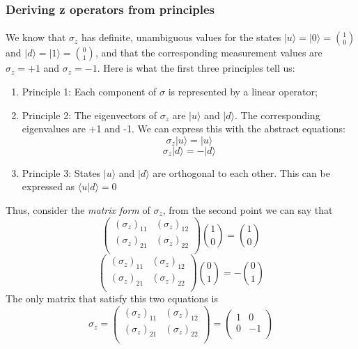 \documentclass[a4paper,10pt]{article}
\begin{document}
\subsubsection{Deriving z operators from principles}

\paragraph{} We know that $\sigma_z$ has definite, unambiguous values for the states $|u\rangle = |0\rangle = \binom{1}{0}$ and $|d\rangle = |1\rangle = \binom{0}{1}$, and that the corresponding measurement values are $\sigma_z = +1$ and $\sigma_z = -1$. Here is what the first three principles tell us:
\begin{enumerate}
    \item Principle 1: Each component of $\sigma$ is represented by a linear operator;
    \item Principle 2: The eigenvectors of $\sigma_z$ are $|u\rangle$ and $|d\rangle$. The corresponding eigenvalues are +1 and -1. We can express this with the abstract equations:
    $$\sigma_z|u\rangle = |u\rangle$$
    $$\sigma_z|d\rangle = -|d\rangle$$
    \item Principle 3: States $|u\rangle$ and $|d\rangle$ are orthogonal to each other. This can be expressed as $\langle u|d\rangle = 0$
\end{enumerate}
Thus, consider the \textit{matrix form} of $\sigma_z$, from the second point we can say that
\begin{equation*}
\left(\begin{matrix}
    (\sigma_z)_{11} & (\sigma_z)_{12} \\
    (\sigma_z)_{21} & (\sigma_z)_{22} \\
\end{matrix}\right) \binom{1}{0} = \binom{1}{0}
\end{equation*}
\begin{equation*}
\left(\begin{matrix}
    (\sigma_z)_{11} & (\sigma_z)_{12} \\
    (\sigma_z)_{21} & (\sigma_z)_{22} \\
\end{matrix}\right) \binom{0}{1} = -\binom{0}{1}
\end{equation*}
The only matrix that satisfy this two equations is
\begin{equation*}
\sigma_z = \left(\begin{matrix}
    (\sigma_z)_{11} & (\sigma_z)_{12} \\
    (\sigma_z)_{21} & (\sigma_z)_{22} \\
\end{matrix}\right) = \left(\begin{matrix}
    1 & 0 \\
    0 & -1 \\
\end{matrix}\right)
\end{equation*}
\end{document}
